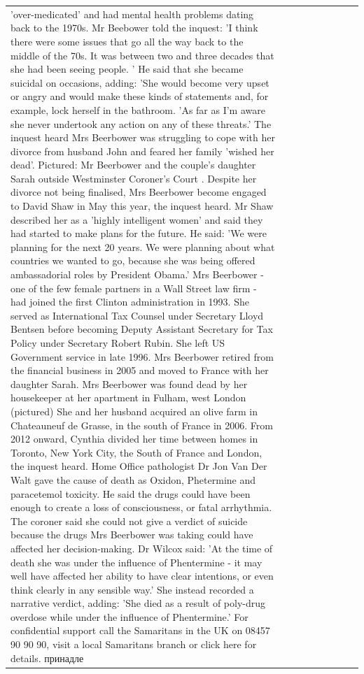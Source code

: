 \begin{table}[H]
\begin{tabular}{lllrlllll}
'over-medicated' and had mental health problems dating back to the 1970s. Mr Beebower told the inquest: 'I think there were some issues that go all the way back to the middle of the 70s. It was between two and three decades that she had been seeing people. ' He said that she became suicidal on occasions, adding: 'She would become very upset or angry and would make these kinds of statements and, for example, lock herself in the bathroom. 'As far as I'm aware she never undertook any action on any of these threats.' The inquest heard Mrs Beerbower was struggling to cope with her divorce from husband John and feared her family 'wished her dead'. Pictured: Mr Beerbower and the couple's daughter Sarah outside Westminster Coroner's Court . Despite her divorce not being finalised, Mrs Beerbower become engaged to David Shaw in May this year, the inquest heard. Mr Shaw described her as a 'highly intelligent women' and said they had started to make plans for the future. He said: 'We were planning for the next 20 years. We were planning about what countries we wanted to go, because she was being offered ambassadorial roles by President Obama.' Mrs Beerbower - one of the few female partners in a Wall Street law firm - had joined the first Clinton administration in 1993. She served as International Tax Counsel under Secretary Lloyd Bentsen before becoming Deputy Assistant Secretary for Tax Policy under Secretary Robert Rubin. She left US Government service in late 1996. Mrs Beerbower retired from the financial business in 2005 and moved to France with her daughter Sarah. Mrs Beerbower was found dead by her housekeeper at her apartment in Fulham, west London (pictured) She and her husband acquired an olive farm in Chateauneuf de Grasse, in the south of France in 2006. From 2012 onward, Cynthia divided her time between homes in Toronto, New York City, the South of France and London, the inquest heard. Home Office pathologist Dr Jon Van Der Walt gave the cause of death as Oxidon, Phetermine and paracetemol toxicity. He said the drugs could have been enough to create a loss of consciousness, or fatal arrhythmia. The coroner said she could not give a verdict of suicide because the drugs Mrs Beerbower was taking could have affected her decision-making. Dr Wilcox said: 'At the time of death she was under the influence of Phentermine - it may well have affected her ability to have clear intentions, or even think clearly in any sensible way.' She instead recorded a narrative verdict, adding: 'She died as a result of poly-drug overdose while under the influence of Phentermine.' For confidential support call the Samaritans in the UK on 08457 90 90 90, visit a local Samaritans branch or click here for details. принадле \\

\end{tabular}
\end{table}
